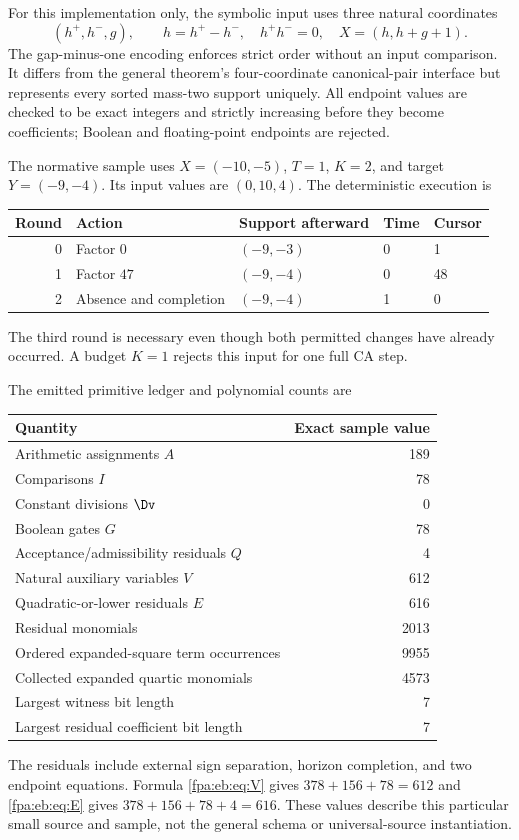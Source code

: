 \documentclass[11pt,a4paper]{article}
\numberwithin{equation}{section}
\begin{document}
For this implementation only, the symbolic input uses three natural coordinates
\[
(h^+,h^-,g),\qquad h=h^+-h^-,\quad h^+h^-=0,
\quad X=(h,h+g+1).
\]
The gap-minus-one encoding enforces strict order without an input comparison. It differs from the general theorem's four-coordinate canonical-pair interface but represents every sorted mass-two support uniquely. All endpoint values are checked to be exact integers and strictly increasing before they become coefficients; Boolean and floating-point endpoints are rejected.

The normative sample uses $X=(-10,-5)$, $T=1$, $K=2$, and target $Y=(-9,-4)$. Its input values are $(0,10,4)$. The deterministic execution is
\begin{center}
\begin{tabular}{@{}rllll@{}}\toprule
Round & Action & Support afterward & Time & Cursor\\\midrule
0 & Factor $0$ & $(-9,-3)$ & 0 & 1\\
1 & Factor $47$ & $(-9,-4)$ & 0 & 48\\
2 & Absence and completion & $(-9,-4)$ & 1 & 0\\\bottomrule
\end{tabular}
\end{center}
The third round is necessary even though both permitted changes have already occurred. A budget $K=1$ rejects this input for one full CA step.

\begin{samepage}
The emitted primitive ledger and polynomial counts are
\begin{center}
\begin{tabular}{@{}lr@{}}\toprule
Quantity & Exact sample value\\\midrule
Arithmetic assignments $A$ & 189\\
Comparisons $I$ & 78\\
Constant divisions $\Dv$ & 0\\
Boolean gates $G$ & 78\\
Acceptance/admissibility residuals $Q$ & 4\\
Natural auxiliary variables $V$ & 612\\
Quadratic-or-lower residuals $E$ & 616\\
Residual monomials & 2013\\
Ordered expanded-square term occurrences & 9955\\
Collected expanded quartic monomials & 4573\\
Largest witness bit length & 7\\
Largest residual coefficient bit length & 7\\\bottomrule
\end{tabular}
\end{center}
\end{samepage}
The residuals include external sign separation, horizon completion, and two endpoint equations. Formula \eqref{fpa:eb:eq:V} gives $378+156+78=612$ and \eqref{fpa:eb:eq:E} gives $378+156+78+4=616$. These values describe this particular small source and sample, not the general schema or universal-source instantiation.
\end{document}
